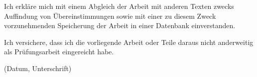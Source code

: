 \documentclass[a4paper,11pt,twoside]{scrreport}
\begin{document}
Ich erkläre mich mit einem Abgleich der Arbeit mit anderen Texten zwecks Auffindung von 
Übereinstimmungen sowie mit einer zu diesem Zweck vorzunehmenden Speicherung der Arbeit in einer 
Datenbank einverstanden.

Ich versichere, dass ich die vorliegende Arbeit oder Teile daraus nicht anderweitig als 
Prüfungsarbeit eingereicht habe.

\vspace{1cm}


\vspace{-1cm}

(Datum, Unterschrift)

\makeheaderempty

\eject
\end{document}
